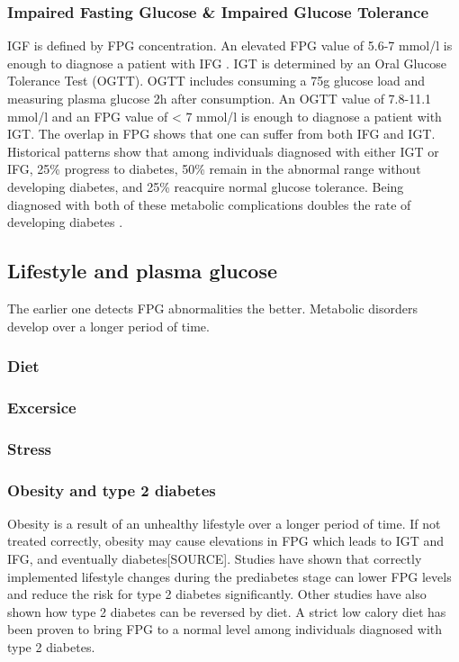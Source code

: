 \documentclass[english, 12pt, a4paper, elec, utf8, a-1b, online]{aaltothesis}
\begin{document}
\subsubsection{Impaired Fasting Glucose \& Impaired Glucose Tolerance}
IGF is defined by FPG concentration. An elevated FPG value of 5.6-7 mmol/l is enough to diagnose 
a patient with IFG \cite{nathan_impaired_2007}. IGT is determined by an Oral Glucose Tolerance 
Test (OGTT). OGTT includes consuming a 75g glucose load and measuring plasma glucose 2h after consumption. 
An OGTT value of 7.8-11.1 mmol/l and an FPG value of < 7 mmol/l is enough to diagnose a patient with IGT\cite{nathan_impaired_2007}. 
The overlap in FPG shows that one can suffer from both IFG and IGT. Historical patterns show that among individuals 
diagnosed with either IGT or IFG, 25\% progress to diabetes, 50\% remain in the abnormal range 
without developing diabetes, and 25\% reacquire normal glucose tolerance. 
Being diagnosed with both of these metabolic complications doubles the rate of developing diabetes \cite{nathan_impaired_2007}.


\subsection{Lifestyle and plasma glucose}
The earlier one detects FPG abnormalities the better. Metabolic disorders develop over a longer period of time.

\subsubsection{Diet}

\subsubsection{Excersice}

\subsubsection{Stress}

\subsubsection{Obesity and type 2 diabetes}
Obesity is a result of an unhealthy lifestyle over a longer period of time. If not treated correctly, obesity may cause elevations in FPG which leads to IGT and IFG, and eventually diabetes[SOURCE]. 
Studies have shown that correctly implemented lifestyle changes during the prediabetes stage can lower FPG levels and reduce the risk for type 2 diabetes significantly\cite{walker_diet_2010}\cite{taylor_type_2013}. 
Other studies have also shown how type 2 diabetes can be reversed by diet\cite{taylor_type_2013}. A strict low calory diet
has been proven to bring FPG to a normal level among individuals diagnosed with type 2 diabetes\cite{taylor_type_2013}. 
\end{document}
